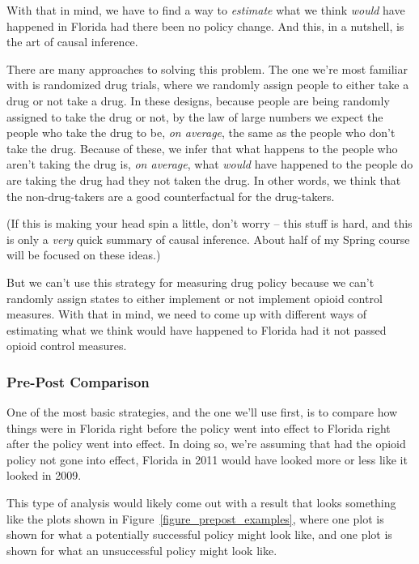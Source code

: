 \documentclass[12pt]{article}
\begin{document}
With that in mind, we have to find a way to \emph{estimate} what we think \emph{would} have happened in Florida had there been no policy change. And this, in a nutshell, is the art of causal inference.

There are many approaches to solving this problem. The one we're most familiar with is randomized drug trials, where we randomly assign people to either take a drug or not take a drug. In these designs, because people are being randomly assigned to take the drug or not, by the law of large numbers we expect the people who take the drug to be, \emph{on average}, the same as the people who don't take the drug. Because of these, we infer that what happens to the people who aren't taking the drug is, \emph{on average}, what \emph{would} have happened to the people do are taking the drug had they not taken the drug. In other words, we think that the non-drug-takers are a good counterfactual for the drug-takers.

(If this is making your head spin a little, don't worry -- this stuff is hard, and this is only a \emph{very} quick summary of causal inference. About half of my Spring course will be focused on these ideas.)

But we can't use this strategy for measuring drug policy because we can't randomly assign states to either implement or not implement opioid control measures. With that in mind, we need to come up with different ways of estimating what we think would have happened to Florida had it not passed opioid control measures.

\subsubsection*{Pre-Post Comparison}

One of the most basic strategies, and the one we'll use first, is to compare how things were in Florida right before the policy went into effect to Florida right after the policy went into effect. In doing so, we're assuming that had the opioid policy not gone into effect, Florida in 2011 would have looked more or less like it looked in 2009.

This type of analysis would likely come out with a result that looks something like the plots shown in Figure~\ref{figure_prepost_examples}, where one plot is shown for what a potentially successful policy might look like, and one plot is shown for what an unsuccessful policy might look like.
\end{document}
